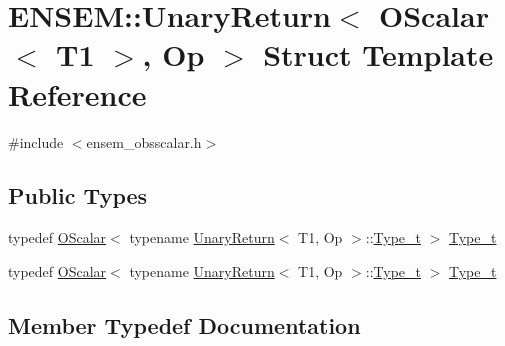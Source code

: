\hypertarget{structENSEM_1_1UnaryReturn_3_01OScalar_3_01T1_01_4_00_01Op_01_4}{}\section{E\+N\+S\+EM\+:\+:Unary\+Return$<$ O\+Scalar$<$ T1 $>$, Op $>$ Struct Template Reference}
\label{structENSEM_1_1UnaryReturn_3_01OScalar_3_01T1_01_4_00_01Op_01_4}


{\ttfamily \#include $<$ensem\+\_\+obsscalar.\+h$>$}

\subsection*{Public Types}
\begin{DoxyCompactItemize}
\item 
typedef \mbox{\hyperlink{classENSEM_1_1OScalar}{O\+Scalar}}$<$ typename \mbox{\hyperlink{structENSEM_1_1UnaryReturn}{Unary\+Return}}$<$ T1, Op $>$\+::\mbox{\hyperlink{structENSEM_1_1UnaryReturn_3_01OScalar_3_01T1_01_4_00_01Op_01_4_a726cb7ab3c097ee6c39cffe7663a39b1}{Type\+\_\+t}} $>$ \mbox{\hyperlink{structENSEM_1_1UnaryReturn_3_01OScalar_3_01T1_01_4_00_01Op_01_4_a726cb7ab3c097ee6c39cffe7663a39b1}{Type\+\_\+t}}
\item 
typedef \mbox{\hyperlink{classENSEM_1_1OScalar}{O\+Scalar}}$<$ typename \mbox{\hyperlink{structENSEM_1_1UnaryReturn}{Unary\+Return}}$<$ T1, Op $>$\+::\mbox{\hyperlink{structENSEM_1_1UnaryReturn_3_01OScalar_3_01T1_01_4_00_01Op_01_4_a726cb7ab3c097ee6c39cffe7663a39b1}{Type\+\_\+t}} $>$ \mbox{\hyperlink{structENSEM_1_1UnaryReturn_3_01OScalar_3_01T1_01_4_00_01Op_01_4_a726cb7ab3c097ee6c39cffe7663a39b1}{Type\+\_\+t}}
\end{DoxyCompactItemize}


\subsection{Member Typedef Documentation}
\mbox{\label{structENSEM_1_1UnaryReturn_3_01OScalar_3_01T1_01_4_00_01Op_01_4_a726cb7ab3c097ee6c39cffe7663a39b1}} 
